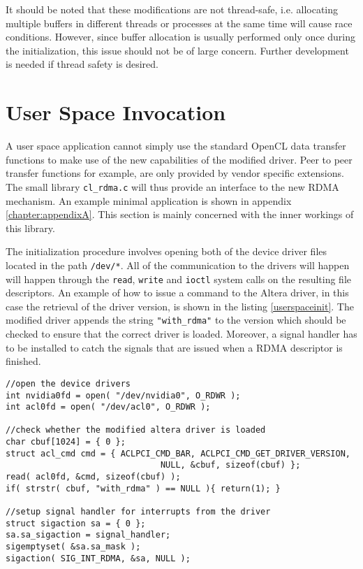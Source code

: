 It should be noted that these modifications are not thread-safe, i.e. allocating multiple buffers in different threads or processes at the same time will cause race conditions.
However, since buffer allocation is usually performed only once during the initialization, this issue should not be of large concern.
Further development is needed if thread safety is desired.













\section{User Space Invocation}
\label{section:userspace}

A user space application cannot simply use the standard OpenCL data transfer functions to make use of the new capabilities of the modified driver.
Peer to peer transfer functions for example, are only provided by vendor specific extensions.
The small library \texttt{cl\_rdma.c} will thus provide an interface to the new RDMA mechanism.
An example minimal application is shown in appendix \ref{chapter:appendixA}.
This section is mainly concerned with the inner workings of this library.


The initialization procedure involves opening both of the device driver files located in the path \texttt{/dev/*}.
All of the communication to the drivers will happen will happen through the \texttt{read}, \texttt{write} and \texttt{ioctl} system calls on the resulting file descriptors.
An example of how to issue a command to the Altera driver, in this case the retrieval of the driver version, is shown in the listing \ref{userspaceinit}.
The modified driver appends the string \texttt{"with\_rdma"} to the version which should be checked to ensure that the correct driver is loaded.
Moreover, a signal handler has to be installed to catch the signals that are issued when a RDMA descriptor is finished.

\begin{lstlisting}[label=userspaceinit,caption=Initialization procedure]
//open the device drivers
int nvidia0fd = open( "/dev/nvidia0", O_RDWR );
int acl0fd = open( "/dev/acl0", O_RDWR );

//check whether the modified altera driver is loaded
char cbuf[1024] = { 0 };
struct acl_cmd cmd = { ACLPCI_CMD_BAR, ACLPCI_CMD_GET_DRIVER_VERSION,
                               NULL, &cbuf, sizeof(cbuf) };
read( acl0fd, &cmd, sizeof(cbuf) );
if( strstr( cbuf, "with_rdma" ) == NULL ){ return(1); }

//setup signal handler for interrupts from the driver
struct sigaction sa = { 0 };
sa.sa_sigaction = signal_handler;
sigemptyset( &sa.sa_mask );
sigaction( SIG_INT_RDMA, &sa, NULL );
\end{lstlisting}

